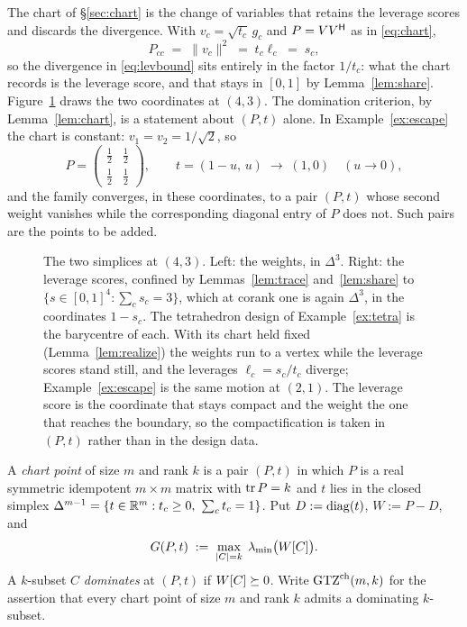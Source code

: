 The chart of \S\ref{sec:chart} is the change of variables that
retains the leverage scores and discards the divergence.  With
$v_c=\sqrt{t_c}\,g_c$ and $P=VV^{\mathsf{H}}$ as in \eqref{eq:chart},
\begin{equation}\label{eq:pivotlev}
  P_{cc}\;=\;\lVert v_c\rVert^2\;=\;t_c\ell_c\;=\;s_c ,
\end{equation}
so the divergence in \eqref{eq:levbound} sits entirely in the factor
$1/t_c$: what the chart records is the leverage score, and that stays in
$[0,1]$ by Lemma~\ref{lem:share}.  Figure~\ref{fig:twosimplices} draws the
two coordinates at $(4,3)$.  The domination criterion, by
Lemma~\ref{lem:chart}, is a statement about $(P,t)$ alone.  In
Example~\ref{ex:escape} the chart is constant: $v_1=v_2=1/\sqrt2$, so
\[
  P=\begin{pmatrix}\tfrac12&\tfrac12\\[2pt]\tfrac12&\tfrac12\end{pmatrix},
  \qquad t=(1-u,\,u)\;\longrightarrow\;(1,0)\quad(u\to0),
\]
and the family converges, in these coordinates, to a pair $(P,t)$ whose
second weight vanishes while the corresponding diagonal entry of $P$ does
not.  Such pairs are the points to be added.

\begin{figure}[ht]
  \centering
  
  \caption{The two simplices at $(4,3)$.  Left: the weights, in
  $\Delta^{3}$.  Right: the leverage scores, confined by
  Lemmas~\ref{lem:trace} and~\ref{lem:share} to
  $\{s\in[0,1]^{4}:\sum_c s_c=3\}$, which at corank one is again
  $\Delta^{3}$, in the coordinates $1-s_c$.  The tetrahedron design of
  Example~\ref{ex:tetra} is the barycentre of each.  With its chart held
  fixed (Lemma~\ref{lem:realize}) the weights run to a vertex while the
  leverage scores stand still, and the leverages $\ell_c=s_c/t_c$
  diverge; Example~\ref{ex:escape} is the same motion at $(2,1)$.  The
  leverage score is the coordinate that stays compact and the weight the
  one that reaches the boundary, so the compactification is taken in
  $(P,t)$ rather than in the design data.}
  \label{fig:twosimplices}
\end{figure}

\begin{definition}\label{def:chartpoint}
A \emph{chart point} of size $m$ and rank $k$ is a pair $(P,t)$ in which
$P$ is a real symmetric idempotent $m\times m$ matrix with $\operatorname{tr} P=k$ and
$t$ lies in the closed simplex
$\Delta^{m-1}=\{t\in\R^m:t_c\ge0,\ \sum_ct_c=1\}$.  Put $D:=\operatorname{diag}(t)$,
$W:=P-D$, and
\begin{equation}\label{eq:objective}
  G(P,t)\;:=\;\max_{\lvert C\rvert=k}\;\lambda_{\min}\bigl(W[C]\bigr) .
\end{equation}
A $k$-subset $C$ \emph{dominates} at $(P,t)$ if $W[C]\succeq0$.  Write
$\mathrm{GTZ}^{\mathrm{ch}}(m,k)$ for the assertion that every chart point of
size $m$ and rank $k$ admits a dominating $k$-subset.
\end{definition}


